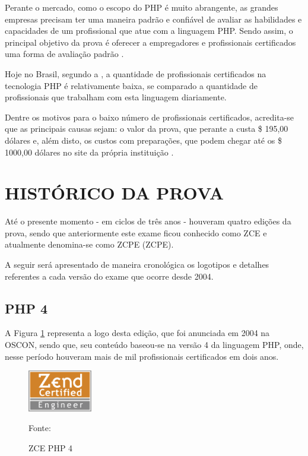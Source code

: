 Perante o mercado, como o escopo do PHP é muito abrangente, as grandes empresas
precisam ter uma maneira padrão e confiável de avaliar as habilidades e 
capacidades de um profissional que atue com a linguagem PHP. Sendo assim, o
principal objetivo da prova é oferecer a empregadores e profissionais 
certificados uma forma de avaliação padrão \cite{zendPhp5CertificationStudyGuide}.

Hoje no Brasil, segundo a , a 
quantidade de profissionais certificados na tecnologia PHP é relativamente 
baixa, se comparado a quantidade de profissionais que trabalham com esta 
linguagem diariamente.

Dentre os motivos para o baixo número de profissionais certificados, acredita-se
que as principais causas sejam: o valor da prova, que perante a 
 custa \$ 195,00 dólares e, além disto, 
os custos com preparações, que podem chegar até os \$ 1000,00 dólares no site da 
própria instituição \cite{websiteZendOnlineTraining}.

\section{HISTÓRICO DA PROVA}

Até o presente momento - em ciclos de três anos - houveram quatro edições da
prova, sendo que anteriormente este exame ficou conhecido como \ac{ZCE} e
atualmente denomina-se como \acl{ZCPE} (\acs{ZCPE}).

A seguir será apresentado de maneira cronológica os logotipos e detalhes
referentes a cada versão do exame que ocorre desde 2004.

\subsection{PHP 4}

A Figura \ref{fig:logoCertificationPHP4} representa a logo desta edição, que
foi anunciada em 2004 na \ac{OSCON}, sendo que, seu conteúdo baseou-se na versão
4 da linguagem \acs{PHP}, onde, nesse período houveram mais de mil profissionais 
certificados em dois anos.

\begin{figure}[h!tb]
	\caption{ZCE PHP 4}
	\label{fig:logoCertificationPHP4}

	\centering
	\includegraphics[width=0.25\textwidth]{images/logo/php4.png}

	\centering
	\footnotesize Fonte: 
\end{figure}

